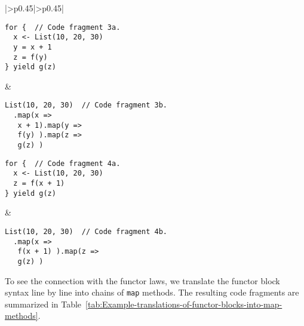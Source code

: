 \begin{table}
\begin{centering}
\begin{tabular}{|>{\centering}p{0.45\textwidth}|>{\centering}p{0.45\textwidth}|}
\begin{minipage}[t]{1.06\linewidth}%
\vspace{-0.86\baselineskip}
\begin{lstlisting}
for {  // Code fragment 3a.
  x <- List(10, 20, 30)
  y = x + 1
  z = f(y)
} yield g(z)
\end{lstlisting}
\vspace{-0.25\baselineskip}
%
\end{minipage} & \hspace*{-0.0278\linewidth}%
\begin{minipage}[t]{1.06\linewidth}%
\vspace{-0.86\baselineskip}
\begin{lstlisting}
List(10, 20, 30)  // Code fragment 3b.
  .map(x =>
   x + 1).map(y =>
   f(y) ).map(z =>
   g(z) )
\end{lstlisting}
\vspace{-0.25\baselineskip}
%
\end{minipage}\tabularnewline
\hline 
\hspace*{-0.0278\linewidth}%
\begin{minipage}[t]{1.06\linewidth}%
\vspace{-0.86\baselineskip}
\begin{lstlisting}
for {  // Code fragment 4a.
  x <- List(10, 20, 30)
  z = f(x + 1)
} yield g(z)
\end{lstlisting}
\vspace{-0.1\baselineskip}
%
\end{minipage} & \hspace*{-0.0278\linewidth}%
\begin{minipage}[t]{1.06\linewidth}%
\vspace{-0.86\baselineskip}
\begin{lstlisting}
List(10, 20, 30)  // Code fragment 4b.
  .map(x =>
   f(x + 1) ).map(z =>
   g(z) )
\end{lstlisting}
\vspace{-0.1\baselineskip}
%
\end{minipage}\tabularnewline
\hline 
\end{tabular}
\par\end{centering}
\caption{Example translations of functor blocks into \lstinline!map! methods.\label{tab:Example-translations-of-functor-blocks-into-map-methods}}
\end{table}

To see the connection with the functor laws, we translate the functor
block syntax line by line into chains of \lstinline!map! methods.
The resulting code fragments are summarized in Table~\ref{tab:Example-translations-of-functor-blocks-into-map-methods}.

